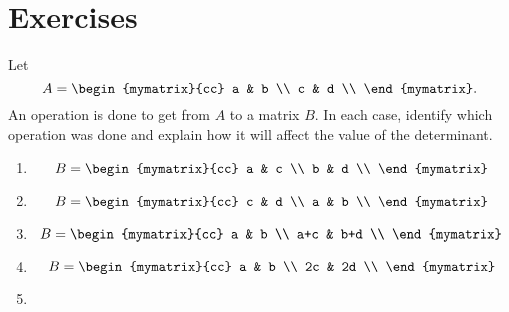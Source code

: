 \section*{Exercises}

\begin{ex}
  Let
  \begin{equation*}
    A = \begin{mymatrix}{cc}
      a & b \\
      c & d \\
    \end{mymatrix}.
  \end{equation*}
  An operation is done to get from $A$ to a matrix $B$. In each case,
  identify which operation was done and explain how it will affect the
  value of the determinant.
  \begin{enumerate}
  \item
    \begin{equation*}
      B = \begin{mymatrix}{cc}
        a & c \\
        b & d \\
      \end{mymatrix}
    \end{equation*}
  \item
    \begin{equation*}
      B = \begin{mymatrix}{cc}
        c & d \\
        a & b \\
      \end{mymatrix}
    \end{equation*}
  \item
    \begin{equation*}
      B = \begin{mymatrix}{cc}
        a   & b   \\
        a+c & b+d \\
      \end{mymatrix}
    \end{equation*}
  \item
    \begin{equation*}
      B = \begin{mymatrix}{cc}
        a  & b  \\
        2c & 2d \\
      \end{mymatrix}
    \end{equation*}
  \item
    \begin{equation*}

\end{equation*}
\end{enumerate}
\end{ex}
